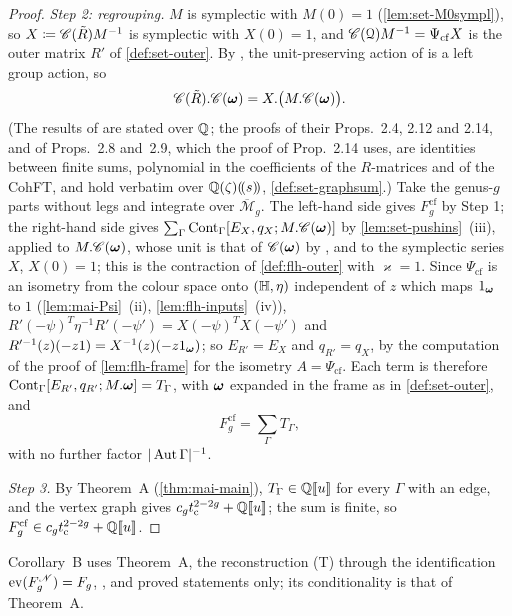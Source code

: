 \begin{proof}
\emph{Step 2: regrouping.} $M$ is symplectic with $M(0)=1$ (\cref{lem:set-M0sympl}), so $X\coloneqq\mathscr{C}(\tilde R)M^{-1}$ is symplectic with $X(0)=1$, and $\mathscr{C}(\mathcal{Q})M^{-1}=\Psi_{\mathrm{cf}}X$ is the outer matrix $R'$ of \cref{def:set-outer}. By \cite[Prop.~2.14]{PPZ15}, the unit-preserving action of \cite[Def.~2.13]{PPZ15} is a left group action, so
\[
\mathscr{C}(\tilde R).\mathscr{C}(\boldsymbol{\omega})=X.\bigl(M.\mathscr{C}(\boldsymbol{\omega})\bigr).
\]
(The results of \cite{PPZ15} are stated over $\mathbb{Q}$; the proofs of their Props.~2.4, 2.12 and 2.14, and of Props.~2.8 and~2.9, which the proof of Prop.~2.14 uses, are identities between finite sums, polynomial in the coefficients of the $R$-matrices and of the CohFT, and hold verbatim over $\mathbb{Q}(\zeta)(\!(s)\!)$, \cref{def:set-graphsum}.) Take the genus-$g$ parts without legs and integrate over $\overline{\mathcal M}_g$. The left-hand side gives $F_g^{\mathrm{cf}}$ by Step 1; the right-hand side gives $\sum_\Gamma\mathrm{Cont}_\Gamma[E_X,q_X;M.\mathscr{C}(\boldsymbol{\omega})]$ by \cref{lem:set-pushins}~(iii), applied to $M.\mathscr{C}(\boldsymbol{\omega})$, whose unit is that of $\mathscr{C}(\boldsymbol{\omega})$ by \cite[Prop.~2.12]{PPZ15}, and to the symplectic series $X$, $X(0)=1$; this is the contraction of \cref{def:flh-outer} with $\varkappa=1$. Since $\Psi_{\mathrm{cf}}$ is an isometry from the colour space onto $(\mathbb{H},\eta)$ independent of $z$ which maps $1_{\boldsymbol{\omega}}$ to $1$ (\cref{lem:mai-Psi}~(ii), \cref{lem:flh-inputs}~(iv)), $R'(-\psi)^T\eta^{-1}R'(-\psi')=X(-\psi)^TX(-\psi')$ and $R'^{-1}(z)(-z1)=X^{-1}(z)(-z1_{\boldsymbol{\omega}})$; so $E_{R'}=E_X$ and $q_{R'}=q_X$, by the computation of the proof of \cref{lem:flh-frame} for the isometry $A=\Psi_{\mathrm{cf}}$. Each term is therefore $\mathrm{Cont}_\Gamma[E_{R'},q_{R'};M.\boldsymbol{\omega}]=T_\Gamma$, with $\boldsymbol{\omega}$ expanded in the frame as in \cref{def:set-outer}, and
\[
F_g^{\mathrm{cf}}=\sum_\Gamma T_\Gamma ,
\]
with no further factor $|\operatorname{Aut}\Gamma|^{-1}$.

\emph{Step 3.} By Theorem~A (\cref{thm:mai-main}), $T_\Gamma\in\mathbb{Q}[\![ u ]\!]$ for every $\Gamma$ with an edge, and the vertex graph gives $c_gt_{\mathrm{c}}^{2-2g}+\mathbb{Q}[\![ u ]\!]$; the sum is finite, so $F_g^{\mathrm{cf}}\in c_gt_{\mathrm{c}}^{2-2g}+\mathbb{Q}[\![ u ]\!]$.
\end{proof}

Corollary~B uses Theorem~A, the reconstruction (T) through the identification $\operatorname{ev}(F_g^{\mathscr{N}})=F_g$, \cite[\S0.2, (1); Def.~0.3; (5); Rem.~2.1; Defs.~2.2 and~2.5, with the conventions stated after them; (8); Prop.~2.12; Def.~2.13; Prop.~2.14, with Props.~2.4, 2.8 and~2.9 through its proof]{PPZ15}, and proved statements only; its conditionality is that of Theorem~A.

